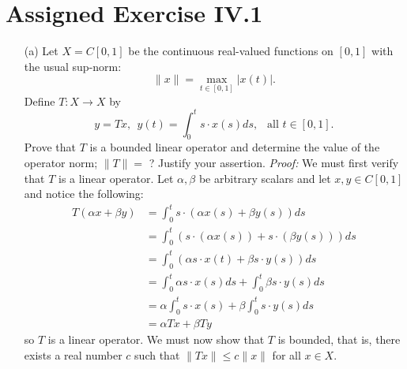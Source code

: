 \documentclass{article}
\begin{document}
\section*{Assigned Exercise IV.1}
\begin{itemize}
    \item[(a)] Let $X = C[0,1]$ be the continuous real-valued functions on $[0,1]$ with the usual sup-norm: 
    \[\|x\| = \max_{t \in [0,1]} |x(t)|.\]
    Define $T: X \to X$ by
    \[y = Tx, \:\: y(t) = \int_0^ts \cdot x(s)ds, \:\: \text{ all } t \in [0,1].\]
    Prove that $T$ is a bounded linear operator and determine the value of the operator norm; $\|T\| = $ ? Justify your assertion.
    \newline\newline
    \textit{Proof:} We must first verify that $T$ is a linear operator. Let $\alpha, \beta$ be arbitrary scalars and let $x,y \in C[0,1]$ and notice the following:
    \begin{align*}
        T(\alpha x + \beta y) &= \int_0^t s\cdot(\alpha x(s) + \beta y(s))ds\\
        &= \int_0^t (s\cdot (\alpha x(s)) + s \cdot (\beta y(s)))ds\\
        &= \int_0^t (\alpha s\cdot x(t) + \beta s\cdot y(s))ds\\
        &=\int_0^t \alpha s\cdot x(s) ds + \int_0^t \beta s\cdot y(s)ds\\
        &= \alpha \int_0^t s\cdot x(s) + \beta \int_0^t s\cdot y(s)ds\\
        &= \alpha Tx + \beta Ty
    \end{align*}
    so $T$ is a linear operator. We must now show that $T$ is bounded, that is, there exists a real number $c$ such that $\|Tx\| \leq c\|x\|$ for all $x \in X$. 
    

\end{itemize}
\end{document}
